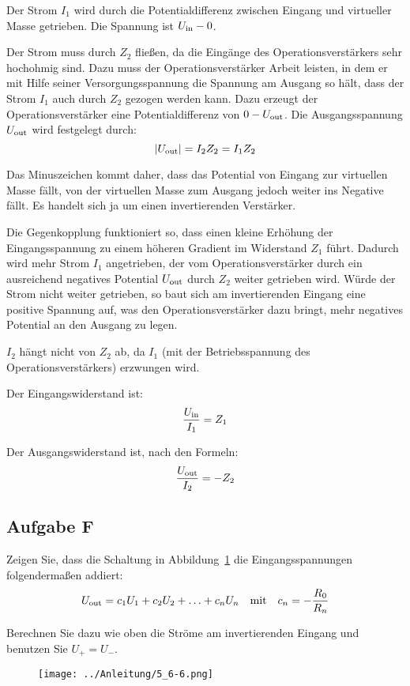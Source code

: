 Der Strom $I_1$ wird durch die Potentialdifferenz zwischen Eingang und
virtueller Masse getrieben. Die Spannung ist $U_\text{in} - 0$.

Der Strom muss durch $Z_2$ fließen, da die Eingänge des Operationsverstärkers
sehr hochohmig sind. Dazu muss der Operationsverstärker Arbeit leisten, in dem
er mit Hilfe seiner Versorgungsspannung die Spannung am Ausgang so hält, dass
der Strom $I_1$ auch durch $Z_2$ gezogen werden kann. Dazu erzeugt der
Operationsverstärker eine Potentialdifferenz von $0 - U_\text{out}$. Die
Ausgangsspannung $U_\text{out}$ wird festgelegt durch:
\[
	|U_\text{out}| = I_2 Z_2 = I_1 Z_2
\]

Das Minuszeichen kommt daher, dass das Potential von Eingang zur virtuellen
Masse fällt, von der virtuellen Masse zum Ausgang jedoch weiter ins Negative
fällt. Es handelt sich ja um einen invertierenden Verstärker.

Die Gegenkopplung funktioniert so, dass einen kleine Erhöhung der
Eingangsspannung zu einem höheren Gradient im Widerstand $Z_1$ führt. Dadurch
wird mehr Strom $I_1$ angetrieben, der vom Operationsverstärker durch ein
ausreichend negatives Potential $U_\text{out}$ durch $Z_2$ weiter getrieben wird.
Würde der Strom nicht weiter getrieben, so baut sich am invertierenden Eingang
eine positive Spannung auf, was den Operationsverstärker dazu bringt, mehr
negatives Potential an den Ausgang zu legen.

$I_2$ hängt nicht von $Z_2$ ab, da $I_1$ (mit der Betriebsspannung des
Operationsverstärkers) erzwungen wird. 

Der Eingangswiderstand ist:
\[
	\frac{U_\text{in}}{I_1} = Z_1
\]

Der Ausgangswiderstand ist, nach den Formeln:
\[
	\frac{U_\text{out}}{I_2} = - Z_2
\]

\subsection{Aufgabe F}
\label{ssec:Aufgabe_F}

\begin{problem}
	Zeigen Sie, dass die Schaltung in Abbildung~\ref{fig:5_6-6} die
	Eingangsspannungen folgendermaßen addiert:
	\[
		U_\text{out} = c_1 U_1 + c_2 U_2 + \ldots + c_n U_n
		\quad \text{mit} \quad
		c_n = - \frac{R_0}{R_n}
	\]

	Berechnen Sie dazu wie oben die Ströme am invertierenden Eingang und
	benutzen Sie $U_+ = U_-$.
\end{problem}

\begin{figure}[htbp]
	\centering
	\texttt{[image: ../Anleitung/5\_6-6.png]}
	\caption{%
		\cite[Abbildung~5/6.6]{physik313-Anleitung}
	}
	\label{fig:5_6-6}
\end{figure}

